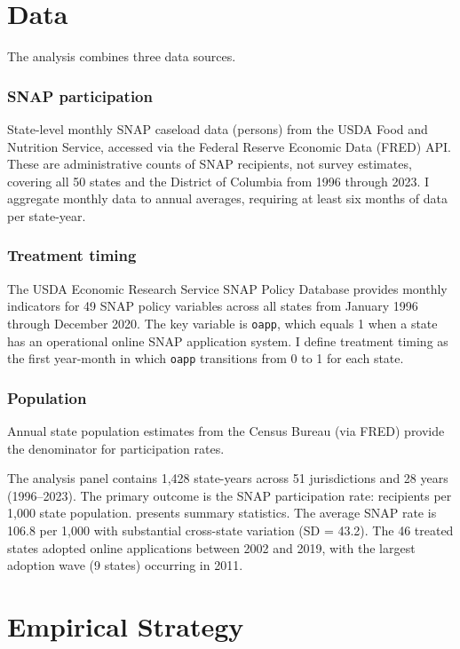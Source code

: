 \documentclass[12pt]{article}
\begin{document}
\section{Data}

The analysis combines three data sources.

\subsubsection*{SNAP participation} State-level monthly SNAP caseload data (persons) from the USDA Food and Nutrition Service, accessed via the Federal Reserve Economic Data (FRED) API. These are administrative counts of SNAP recipients, not survey estimates, covering all 50 states and the District of Columbia from 1996 through 2023. I aggregate monthly data to annual averages, requiring at least six months of data per state-year.

\subsubsection*{Treatment timing} The USDA Economic Research Service SNAP Policy Database provides monthly indicators for 49 SNAP policy variables across all states from January 1996 through December 2020. The key variable is \texttt{oapp}, which equals 1 when a state has an operational online SNAP application system. I define treatment timing as the first year-month in which \texttt{oapp} transitions from 0 to 1 for each state.

\subsubsection*{Population} Annual state population estimates from the Census Bureau (via FRED) provide the denominator for participation rates.

The analysis panel contains 1,428 state-years across 51 jurisdictions and 28 years (1996--2023). The primary outcome is the SNAP participation rate: recipients per 1,000 state population.  presents summary statistics. The average SNAP rate is 106.8 per 1,000 with substantial cross-state variation (SD = 43.2). The 46 treated states adopted online applications between 2002 and 2019, with the largest adoption wave (9 states) occurring in 2011.



\section{Empirical Strategy}
\end{document}
